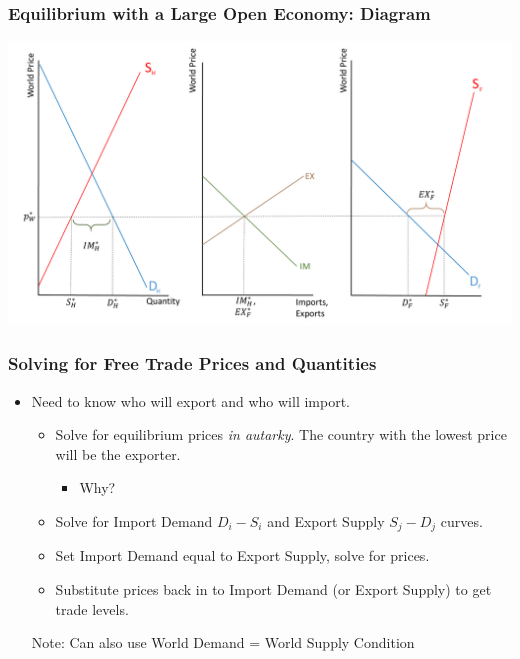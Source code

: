 \documentclass{beamer}
\begin{document}
\begin{frame}
	\frametitle{Equilibrium with a Large Open Economy: Diagram}
	\includegraphics[scale=0.3]{SL_10.pdf}
\end{frame}

\begin{frame}
	\frametitle{Solving for Free Trade Prices and Quantities}
\begin{itemize}
	\item Need to know who will export and who will import.
		\begin{itemize}
			\item Solve for equilibrium prices \emph{in autarky}. The country with the lowest price will be the exporter.
				\begin{itemize}
					\item Why?
				\end{itemize}
	\item Solve for Import Demand $D_i - S_i$ and Export Supply $S_j-D_j$ curves.
	\item Set Import Demand equal to Export Supply, solve for prices.
	\item Substitute prices back in to Import Demand (or Export Supply) to get trade levels.
		\end{itemize}\vspace{4mm}
Note: Can also use World Demand = World Supply Condition
\end{itemize}
\end{frame}
\end{document}
